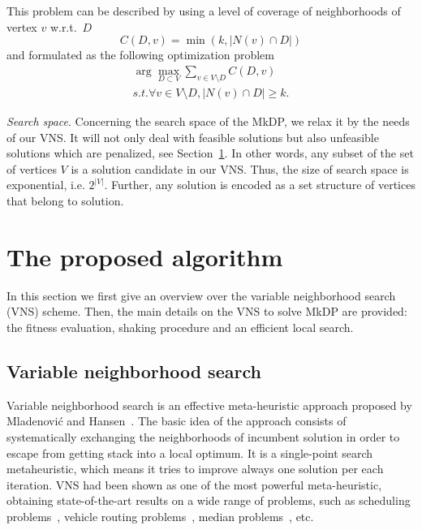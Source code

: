 \documentclass[dvipsnames,format=sigconf,anonymous=true,review=true]{acmart}
\begin{document}
    
    This problem can be described by using a level of coverage of neighborhoods of vertex $v$ w.r.t.\ $D$
    \begin{equation}
    	C(D, v) = \min(k, |N(v) \cap D|)
    \end{equation}
and  formulated as the following optimization problem 
\begin{align}
    \arg \max_{D \subset V } \sum_{v \in V\setminus D} C(D,v) \\
    s.t. \forall v \in V \setminus D, |N(v) \cap D| \geq k.
\end{align}
    
\emph{Search space}.    Concerning the search space of the MkDP, we relax it by the needs of our VNS. It will not only deal with feasible solutions but also unfeasible solutions  which are  penalized, see Section~\ref{sec:vns}.  In other words, any subset of the set of vertices $V$ is a solution candidate in our VNS. Thus, the size of search space is exponential, i.e. $2^{|V|}$.  Further, any solution is encoded as a set structure of vertices that belong to solution. 
   
   
\section{The proposed algorithm}\label{sec:vns}

In this section we first give an overview over the variable neighborhood search (VNS) scheme. Then, the main details on the VNS to solve MkDP are provided: the fitness evaluation, shaking procedure and an efficient local search.
 
  \subsection{Variable neighborhood search}
 Variable neighborhood search is an effective meta-heuristic approach proposed by Mladenović and Hansen~\cite{mladenovic1997variable}. The basic idea of the approach consists of systematically exchanging the neighborhoods of incumbent solution in order to escape from getting stack into a  local optimum. It is a single-point search metaheuristic, which means it tries to improve always one solution per each iteration. VNS had been shown as one of the most powerful meta-heuristic, obtaining state-of-the-art results on a wide range of problems, such as scheduling problems~\cite{fleszar2004solving}, vehicle routing problems~\cite{rezgui2019application}, median problems~\cite{herran2019variable}, etc.  
  
\end{document}
